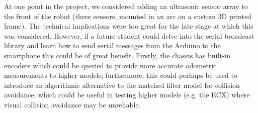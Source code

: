 \documentclass[a4paper,11pt,twoside,openright]{article}
\begin{document}
At one point in the project, we considered adding an ultrasonic sensor
array to the front of the robot (three sensors, mounted in an arc on a
custom 3D printed frame). The technical implications were too great
for the late stage at which this was considered. However, if a future
student could delve into the serial broadcast library and learn how to
send serial messages from the Arduino to the smartphone this could be
of great benefit. Firstly, the chassis has built-in encoders which
could be queried to provide more accurate odometric measurements to
higher models; furthermore, this could perhaps be used to introduce an
algorithmic alternative to the matched filter model for collision
avoidance, which could be useful in testing higher models (e.g. the
ECX) where visual collision avoidance may be unreliable.



\end{document}
